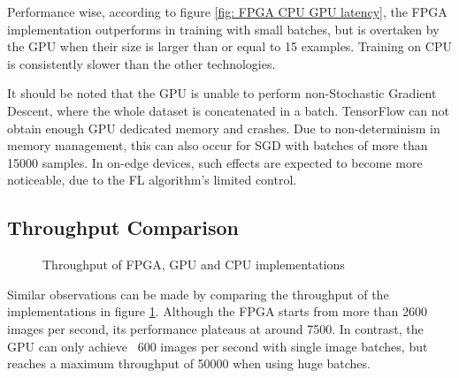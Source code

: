 Performance wise, according to figure \ref{fig: FPGA CPU GPU latency}, the FPGA implementation outperforms in training with small batches, but is overtaken by the GPU when their size is larger than or equal to 15 examples. Training on CPU is consistently slower than the other technologies.

It should be noted that the GPU is unable to perform non-Stochastic Gradient Descent, where the whole dataset is concatenated in a batch. TensorFlow can not obtain enough GPU dedicated memory and crashes. Due to non-determinism in memory management, this can also occur for SGD with batches of more than 15000 samples. In on-edge devices, such effects are expected to become more noticeable, due to the FL algorithm's limited control.

\subsection{Throughput Comparison}
\begin{figure}[H]
    \center
    \caption[FPGA, GPU, CPU throughput comparison]{Throughput of FPGA, GPU and CPU implementations}
    \label{fig: FPGA CPU GPU throughput}
\end{figure}
Similar observations can be made by comparing the throughput of the implementations in figure \ref{fig: FPGA CPU GPU throughput}. Although the FPGA starts from more than 2600 images per second, its performance plateaus at around 7500. In contrast, the GPU can only achieve ~600 images per second with single image batches, but reaches a maximum throughput of 50000 when using huge batches.

